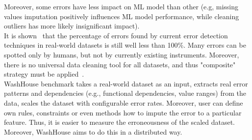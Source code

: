 Moreover, some errors have less impact on ML model than other (e.g, missing values imputation positively influences ML model performance, while cleaning outliers has more likely insignificant impact). 
\\
It is shown~\cite{errors, cleanml} that the percentage of errors found by current error detection techniques in real-world datasets is still well less than 100\%. 
Many errors can be spotted only by humans, but not by currently existing instruments.
Moreover, there is no universal data cleaning tool for all datasets, and thus "composite" strategy must be applied~\cite{errors}.
\\WashHouse benchmark takes a real-world dataset as an input, extracts real error patterns and dependencies (e.g., functional dependencies, value ranges) from the data, scales the dataset with configurable error rates. 
Moreover, user can define own rules, constraints or even methods how to impute the error to a particular feature.
Thus, it is easier to measure the erroneousness of the scaled dataset. Moreover, WashHouse aims to do this in a distributed way.




